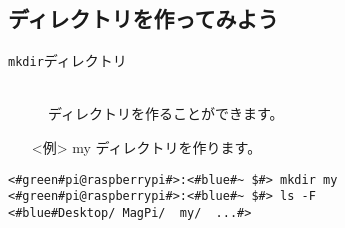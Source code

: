 \newpage
\subsection{ディレクトリを作ってみよう}
\begin{description}
\item[\texttt{mkdir}\textvisiblespace ディレクトリ]\mbox{}\\
ディレクトリを作ることができます。
\end{description}
\begin{itemize}
\item[<例>]my ディレクトリを作ります。
\end{itemize}
\begin{lstlisting}[caption=mkdirの例, label=mkdir]
<#green#pi@raspberrypi#>:<#blue#~ $#> mkdir my
<#green#pi@raspberrypi#>:<#blue#~ $#> ls -F
<#blue#Desktop/	MagPi/	my/	 ...#>
\end{lstlisting}
\begin{tcolorbox}[title=\useOmetoi]
\begin{enumerate}
\end{enumerate}
\end{tcolorbox}
